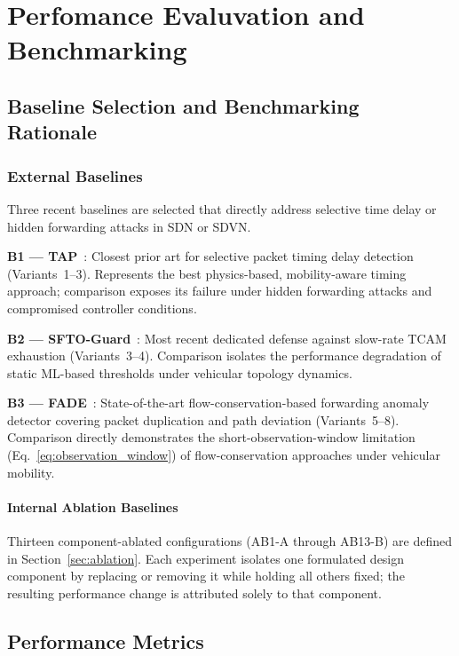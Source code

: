 \documentclass[12pt, a4paper]{report}
\begin{document}
{{\chapter{Perfomance Evaluvation and Benchmarking}
\section{Baseline Selection and Benchmarking Rationale}
\label{sec:baselines}

\subsection{External Baselines}
Three recent baselines are selected that directly address selective
time delay or hidden forwarding attacks in SDN or SDVN.

\textbf{B1 — TAP}~\cite{Arsalan2018}: Closest prior art for
selective packet timing delay detection (Variants~1--3).
Represents the best physics-based, mobility-aware timing approach;
comparison exposes its failure under hidden forwarding attacks and
compromised controller conditions.

\textbf{B2 — SFTO-Guard}~\cite{Tang2023SFTO}: Most recent dedicated
defense against slow-rate TCAM exhaustion (Variants~3--4). Comparison
isolates the performance degradation of static ML-based thresholds
under vehicular topology dynamics.

\textbf{B3 — FADE}~\cite{Zhang2021FADE}: State-of-the-art
flow-conservation-based forwarding anomaly detector covering packet
duplication and path deviation (Variants~5--8). Comparison directly
demonstrates the short-observation-window limitation
(Eq.~\eqref{eq:observation_window}) of flow-conservation approaches
under vehicular mobility.

\subsubsection{Internal Ablation Baselines}
Thirteen component-ablated configurations
(AB1-A through AB13-B) are defined in
Section~\ref{sec:ablation}. Each experiment
isolates one formulated design component by
replacing or removing it while holding all
others fixed; the resulting performance change
is attributed solely to that component.

\section{Performance Metrics}
\label{sec:metrics}

}}
\end{document}
